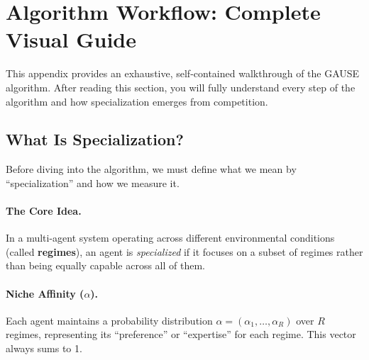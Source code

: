 
\section{Algorithm Workflow: Complete Visual Guide}
\label{sec:workflow}

This appendix provides an exhaustive, self-contained walkthrough of the GAUSE algorithm. After reading this section, you will fully understand every step of the algorithm and how specialization emerges from competition.


\subsection{What Is Specialization?}

Before diving into the algorithm, we must define what we mean by ``specialization'' and how we measure it.

\paragraph{The Core Idea.} In a multi-agent system operating across different environmental conditions (called \textbf{regimes}), an agent is \textit{specialized} if it focuses on a subset of regimes rather than being equally capable across all of them.

\paragraph{Niche Affinity ($\alpha$).} Each agent maintains a probability distribution $\alpha = (\alpha_1, \ldots, \alpha_R)$ over $R$ regimes, representing its ``preference'' or ``expertise'' for each regime. This vector always sums to 1.

